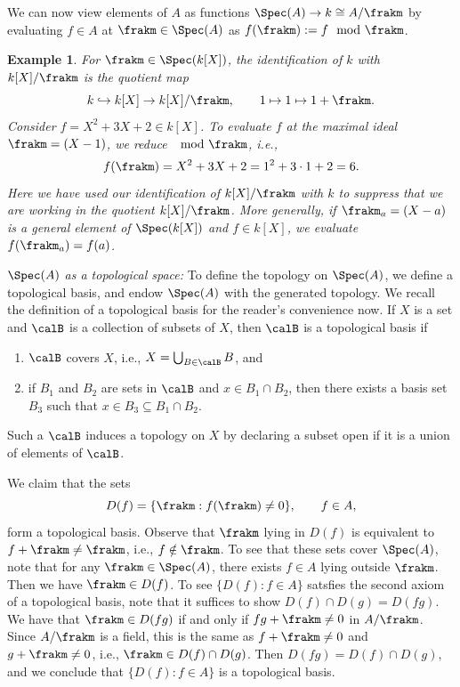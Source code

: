 \documentclass[12pt]{amsart}
\theoremstyle{plain}
\newtheorem{example}[theorem]{Example}
\begin{document}
We can now view elements of $A$ as functions $\Spec(A) \to k \cong A/\frakm$ by evaluating $f\in A$ at $\frakm\in\Spec(A)$ as $f(\frakm):=f \mod \frakm$.

\begin{example}
For $\frakm \in \Spec(k[X])$, the identification of $k$ with $k[X]/\frakm$ is the quotient map
$$k \hookrightarrow k[X] \to k[X]/\frakm, \qquad 1 \mapsto 1 \mapsto 1+\frakm.$$
Consider $f = X^2 +3X +2 \in k[X]$.
To evaluate $f$ at the maximal ideal $\frakm = (X-1)$, we reduce $\mod \frakm$, i.e.,
$$f(\frakm) = X^2 + 3X +2 = 1^2 + 3\cdot 1 +2 = 6.$$
Here we have used our identification of $k[X]/\frakm$ with $k$ to suppress that we are working in the quotient $k[X]/\frakm$.
More generally, if $\frakm_a = (X-a)$ is a general element of $\Spec(k[X])$ and $f \in k[X]$, we evaluate $f(\frakm_a) = f(a)$.
\end{example}

\emph{$\Spec(A)$ as a topological space:}
To define the topology on $\Spec(A)$, we define a topological basis, and endow $\Spec(A)$ with the generated topology.
We recall the definition of a topological basis for the reader's convenience now.
If $X$ is a set and $\calB$ is a collection of subsets of $X$, then $\calB$ is a topological basis if
\begin{enumerate}
\item $\calB$ covers $X$, i.e., $X = \bigcup_{B \in \calB} B$, and
\item if $B_1$ and $B_2$ are sets in $\calB$ and $x \in B_1 \cap B_2$, then there exists a basis set $B_3$ such that $x \in B_3 \subseteq B_1 \cap B_2$.
\end{enumerate}
Such a $\calB$ induces a topology on $X$ by declaring a subset open if it is a union of elements of $\calB$.

We claim that the sets 
$$D(f) = \{\frakm : f(\frakm) \ne 0\}, \qquad f \in A,$$
form a topological basis.
Observe that $\frakm$ lying in $D(f)$ is equivalent to $f + \frakm \ne \frakm$, i.e., $f \notin \frakm$.
To see that these sets cover $\Spec(A)$, note that for any $\frakm \in \Spec(A)$, there exists $f \in A$ lying outside $\frakm$.
Then we have $\frakm \in D(f)$.
To see $\{D(f) : f \in A\}$ satsfies the second axiom of a topological basis, note that it suffices to show $D(f) \cap D(g) = D(fg)$.
We have that $\frakm \in D(fg)$ if and only if $fg +\frakm \ne 0$ in $A/\frakm$.
Since $A/\frakm$ is a field, this is the same as $f+\frakm \ne 0$ and $g+\frakm \ne 0$, i.e., $\frakm \in D(f) \cap D(g)$.
Then $D(fg)=D(f)\cap D(g)$, and we conclude that $\{D(f) : f \in A\}$ is a topological basis.
\end{document}
